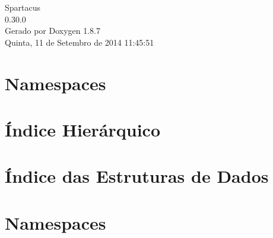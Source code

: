 \documentclass[twoside]{book}
\newcommand{\+}{\discretionary{\mbox{\scriptsize$\hookleftarrow$}}{}{}}
\newcommand{\clearemptydoublepage}{%
  \newpage{\pagestyle{empty}\cleardoublepage}%
}
\begin{document}
\hypersetup{pageanchor=false,
             bookmarks=true,
             bookmarksnumbered=true,
             pdfencoding=unicode
            }
\begin{titlepage}
\vspace*{7cm}
\begin{center}%
{\Large Spartacus \\[1ex]\large 0.\+30.\+0 }\\
\vspace*{1cm}
{\large Gerado por Doxygen 1.8.7}\\
\vspace*{0.5cm}
{\small Quinta, 11 de Setembro de 2014 11:45:51}\\
\end{center}
\end{titlepage}
\clearemptydoublepage
\tableofcontents
\clearemptydoublepage
{}
\hypersetup{pageanchor=true}

\chapter{Namespaces}

\chapter{Índice Hierárquico}

\chapter{Índice das Estruturas de Dados}

\chapter{Namespaces}






\end{document}
